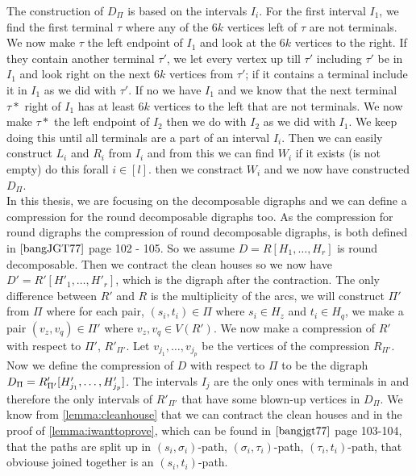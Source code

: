 The construction of $D_{\Pi}$ is based on the intervals $I_i$. 
For the first interval $I_1$, we find the first terminal $\tau$ where any of the $6k$ vertices left of $\tau$ are not terminals.
We now make $\tau$ the left endpoint of $I_1$ and look at the $6k$ vertices to the right. 
If they contain another terminal $\tau '$, we let every vertex up till $\tau '$ including $\tau '$ be in $I_1$ and look right on the next $6k$ vertices from $\tau '$; if it contains a terminal include it in $I_1$ as we did with $\tau '$. 
If no we have $I_1$ and we know that the next terminal $\tau *$ right of $I_1$ has at least $6k$ vertices to the left that are not terminals. We now make $\tau *$ the left endpoint of $I_2$ then we do with $I_2$ as we did with $I_1$.
We keep doing this until all terminals are a part of an interval $I_i$.
Then we can easily construct $L_i$ and $R_i$ from $I_i$ and from this we can find $W_i$ if it exists (is not empty) do this forall $i\in [l]$. then we constract $W_i$ and we now have constructed $D_\Pi$. \\
In this thesis, we are focusing on the decomposable digraphs and we can define a compression for the round decomposable digraphs too. 
As the compression for round digraphs the compression of round decomposable digraphs, is both defined in $\cite{bangJGT77}$ page 102 - 105.
So we assume $D=R[H_1,\dots ,H_r]$ is round decomposable. 
Then we contract the clean houses so we now have $D'=R'[H'_1,\dots ,H'_r]$, which is the digraph after the contraction. 
The only difference between $R'$ and $R$ is the multiplicity of the arcs, we will construct $\Pi '$ from $\Pi$ where for each pair, $(s_i,t_i)\in \Pi$ where $s_i\in H_z$ and $t_i\in H_q$, we make a pair $(v_z,v_q)\in \Pi'$ where $v_z,v_q\in V(R')$.
We now make a compression of $R'$ with respect to $\Pi'$, $R'_{\Pi'}$. 
Let $v_{j_1},\dots ,v_{j_p}$ be the vertices of the compression $R_{\Pi'}$.\\
Now we define the compression of $D$ with respect to $\Pi$ to be the digraph $D_\Pi = R'_{\Pi'}[H'_{j_1},\dots \\ ,H'_{j_p}]$.
The intervals $I_j$ are the only ones with terminals in and therefore the only intervals of $R'_{\Pi'}$ that have some blown-up vertices in $D_\Pi$.
We know from \autoref{lemma:cleanhouse} that we can contract the clean houses and in the proof of \autoref{lemma:iwanttoprove}, which can be found in $\cite{bangjgt77}$ page 103-104, that the paths are split up in $(s_i,\sigma _i)$-path, $(\sigma_i,\tau_i)$-path, $(\tau_i,t_i)$-path, that obviouse joined together is an $(s_i,t_i)$-path. 
